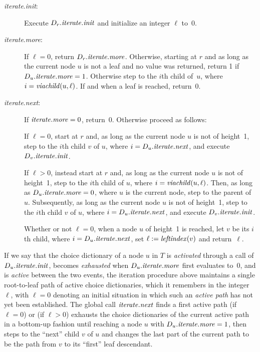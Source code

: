 \documentclass[envcountsame,envcountsect,undated,nolinenumbers]{lnthi}
\def\Tvn#1{\hbox{\textit{#1\/}}}
\begin{document}
\begin{description}
\item[\normalfont\Tvn{iterate}.\Tvn{init}:]
Execute $D_r.\Tvn{iterate}.\Tvn{init}$
and initialize an integer $\ell$ to~0.
\item[\normalfont\Tvn{iterate}.\Tvn{more}:]
If $\ell=0$, return $D_r.\Tvn{iterate}.\Tvn{more}$.
Otherwise,
starting at $r$ and as long as the current node
$u$ is not a leaf and no value was returned,
return 1 if $D_u.\Tvn{iterate}.\Tvn{more}=1$.
Otherwise step to the $i$th child of~$u$,
where $i=\Tvn{viachild}(u,\ell)$.
If and when a leaf is reached, return~0.
\item[\normalfont\Tvn{iterate}.\Tvn{next}:]
If $\Tvn{iterate}.\Tvn{more}=0$, return~0.
Otherwise proceed as follows:

If $\ell=0$, start at $r$ and, as long as the current node
$u$ is not of height~1,
step to the $i$th child $v$ of $u$,
where $i=D_u.\Tvn{iterate}.\Tvn{next}$,
and execute $D_v.\Tvn{iterate}.\Tvn{init}$.

If $\ell>0$, instead start at $r$ and, as long as the current node $u$
is not of height~1, step to the $i$th child of $u$,
where $i=\Tvn{viachild}(u,\ell)$.
Then, as long as $D_u.\Tvn{iterate}.\Tvn{more}=0$,
where $u$ is the current node, step to
the parent of~$u$.
Subsequently, as long as the current node $u$
is not of height~1,
step to the $i$th child $v$ of $u$,
where $i=D_u.\Tvn{iterate}.\Tvn{next}$,
and execute $D_v.\Tvn{iterate}.\Tvn{init}$.

Whether or not $\ell=0$,
when a node $u$ of height~1 is reached,
let $v$ be its $i$th child,
where $i=D_u.\Tvn{iterate}.\Tvn{next}$,
set $\ell:=\Tvn{leftindex}(v)$ and return~$\ell$.
\end{description}

\noindent
If we say that the choice dictionary of
a node $u$ in $T$ is \emph{activated}
through a call of $D_u.\Tvn{iterate}.\Tvn{init}$,
becomes \emph{exhausted} when
$D_u.\Tvn{iterate}.\Tvn{more}$ first evaluates to~0,
and is \emph{active} between the two events,
the iteration procedure above maintains a single
root-to-leaf path of active choice dictionaries,
which it remembers in the integer~$\ell$, with
$\ell=0$ denoting an initial situation in which
such an \emph{active path} has not yet been
established.
The global call $\Tvn{iterate}.\Tvn{next}$
finds a first active path (if $\ell=0$) or
(if $\ell>0$) exhausts the choice dictionaries of 
the current active path in a bottom-up fashion
until reaching a node $u$ with
$D_u.\Tvn{iterate}.\Tvn{more}=1$,
then steps to the ``next'' child $v$ of $u$ and
changes the last part of the current path to
be the path from $v$ to its ``first'' leaf descendant.
\end{document}
